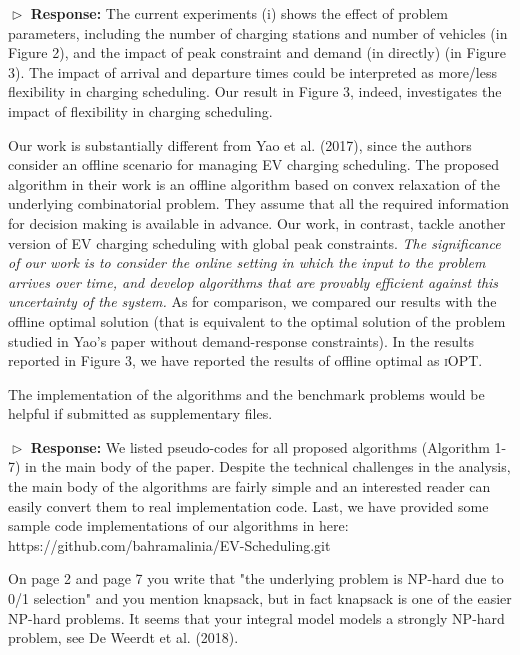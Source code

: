 \documentclass[11pt]{article}
\begin{document}
$\vartriangleright$ \noindent\textbf{Response:} 
The current experiments (i) shows the effect of problem parameters, including the number of charging stations and number of vehicles (in Figure 2), and the impact of peak constraint and demand (in directly) (in Figure 3). The impact of arrival and departure times could be interpreted as more/less flexibility in charging scheduling. Our result in Figure 3, indeed, investigates the impact of flexibility in charging scheduling. 


Our work is substantially different from Yao et al. (2017), since the authors consider an offline scenario for managing EV charging scheduling. The proposed algorithm in their work is an offline algorithm based on convex relaxation of the underlying combinatorial problem. They assume that all the required information for decision making is available in advance. Our work, in contrast, tackle another version of EV charging scheduling with global peak constraints. \textit{The significance of our work is to consider the online setting in which the input to the problem arrives over time, and develop algorithms that are provably efficient against this uncertainty of the system.} As for comparison, we compared our results with the offline optimal solution (that is equivalent to the optimal solution of the problem studied in Yao's paper without demand-response constraints). In the results reported in Figure 3, we have reported the results of offline optimal as \textsc{iOPT}. 


\vspace{3mm}
{\color{blue} The implementation of the algorithms and the benchmark problems would be helpful if submitted as supplementary files. }
\vspace{3mm}

$\vartriangleright$ \noindent\textbf{Response:} 
We listed pseudo-codes for all proposed algorithms (Algorithm 1-7) in the main body of the paper. Despite the technical challenges in the analysis, the main body of the algorithms are fairly simple and an interested reader can easily convert them to real implementation code. Last, we have provided some sample code implementations of our algorithms in 
here: https://github.com/bahramalinia/EV-Scheduling.git
  
\vspace{3mm}
{\color{blue} On page 2 and page 7 you write that "the underlying problem is NP-hard due to 0/1 selection" and you mention knapsack, but in fact knapsack is one of the easier NP-hard problems. It seems that your integral model models a strongly NP-hard problem, see De Weerdt et al. (2018). }
\vspace{3mm}
\end{document}
